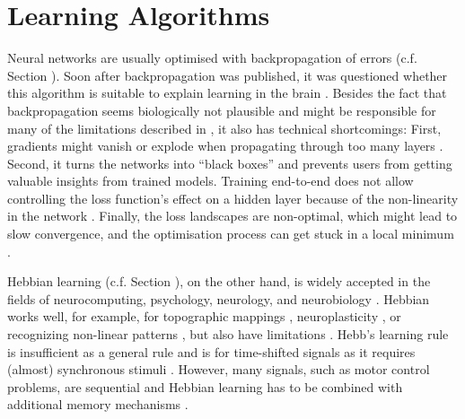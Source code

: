 \section{Learning Algorithms}
Neural networks are usually optimised with backpropagation of errors (c.f. Section ).
Soon after backpropagation was published, it was questioned whether this algorithm is suitable to explain learning in the brain .
Besides the fact that backpropagation seems biologically not plausible and might be responsible for many of the limitations described in , it also has technical shortcomings:
First, gradients might vanish or explode when propagating through too many layers .
Second, it turns the networks into ``black boxes'' and prevents users from getting valuable insights from trained models.
Training end-to-end does not allow controlling the loss function's effect on a hidden layer because of the non-linearity in the network .
Finally, the loss landscapes are non-optimal, which might lead to slow convergence, and the optimisation process can get stuck in a local minimum  .

Hebbian learning (c.f. Section ), on the other hand, is widely accepted in the fields of neurocomputing, psychology, neurology, and neurobiology .
Hebbian works well, for example, for topographic mappings , neuroplasticity , or recognizing non-linear patterns , but also have limitations .
Hebb's learning rule is insufficient as a general rule and is for time-shifted signals as it requires (almost) synchronous stimuli \cite{Anderson_1998}.
However, many signals, such as motor control problems, are sequential and Hebbian learning has to be combined with additional memory mechanisms .

